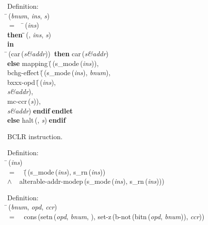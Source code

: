 \begin{tabbing}{\sc Definition}: \\  
\=\,({\it{bnum\/}}, {\it{ins\/}}, {\it{s\/}}) \\ 
$=$$\;\;\;\;$\=\,({\it{ins\/}}) \\ 
{\bf then }\=\=\,({}, {\it{ins\/}}, {\it{s\/}})\- \\ 
{\bf in} \\ 
\=\,({\rm{car}}\,({\it{s\&addr\/}}))$\;\;${\bf then }{\rm{car}}\,({\it{s\&addr\/}}) \\ 
{\bf else }{\rm{mapping}}\,(\=\,({\rm{s\_mode}}\,({\it{ins\/}})), \\ 
{\rm{bchg-effect}}\,(\=\,({\rm{s\_mode}}\,({\it{ins\/}}), {\it{bnum\/}}), \\ 
{\rm{bxxx-opd}}\,(\=\,({\it{ins\/}}), \\ 
{\it{s\&addr\/}})\-, \\ 
{\rm{mc-ccr}}\,({\it{s\/}}))\-, \\ 
{\it{s\&addr\/}})\-$\;${\bf  endif}\-$\;${\bf  endlet}\- \\ 
{\bf else }{\rm{halt}}\,({}, {\it{s\/}})$\;${\bf  endif}\-\-
\end{tabbing}

 BCLR instruction.
\begin{tabbing}{\sc Definition}: \\  
\=\,({\it{ins\/}}) \\ 
$=$$\;\;\;\;$(\=\,({\rm{s\_mode}}\,({\it{ins\/}}), {\rm{s\_rn}}\,({\it{ins\/}})) \\ 
$\wedge$$\;\;\;\;${\rm{alterable-addr-modep}}\,({\rm{s\_mode}}\,({\it{ins\/}}), {\rm{s\_rn}}\,({\it{ins\/}})))\-\-
\end{tabbing}

\begin{tabbing}{\sc Definition}: \\  
\=\,({\it{bnum\/}}, {\it{opd\/}}, {\it{ccr\/}}) \\ 
$=$$\;\;\;\;${\rm{cons}}\,({\rm{setn}}\,({\it{opd\/}}, {\it{bnum\/}}, {}), {\rm{set-z}}\,({\rm{b-not}}\,({\rm{bitn}}\,({\it{opd\/}}, {\it{bnum\/}})), {\it{ccr\/}}))\-
\end{tabbing}

